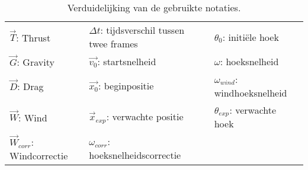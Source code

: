 \begin{table}[h]
	\centering
	\begin{tabular}{ l|l|l }
		\(\vec{T}\): Thrust & \(\Delta t\): tijdsverschil tussen twee frames & \(\theta_0\): initi\"ele hoek \\
		\(\vec{G}\): Gravity & \(\vec{v_0}\): startsnelheid & \(\omega\): hoeksnelheid\\
		\(\vec{D}\): Drag & \(\vec{x_0}\): beginpositie&\(\omega_{wind}\): windhoeksnelheid\\
		\(\vec{W}\): Wind & \(\vec{x}_{exp}\): verwachte positie&\(\theta_{exp}\): verwachte hoek\\
		\(\vec{W}_{corr}\): Windcorrectie & \(\omega_{corr}\): hoeksnelheidscorrectie &\\
	\end{tabular}
	\caption{\label{table: uitlegFormule}Verduidelijking van de gebruikte notaties.}
\end{table}